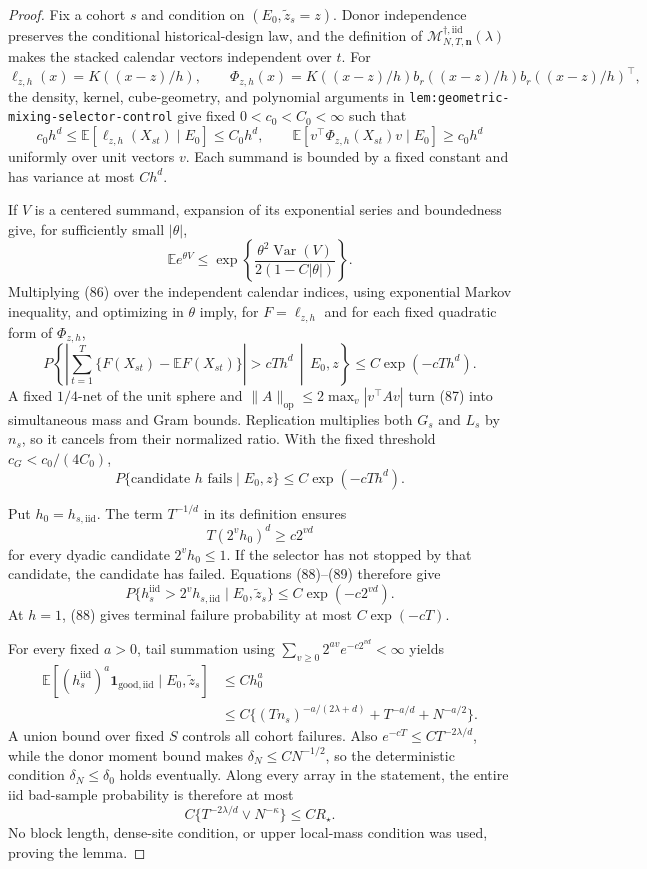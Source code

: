 \documentclass{article}
\begin{document}
\begin{proof}
Fix a cohort \(s\) and condition on \((E_0,\widetilde z_s=z)\).  Donor independence preserves the conditional historical-design law, and the definition of \(\mathcal M_{N,T,\mathbf n}^{\dagger,\mathrm{iid}}(\lambda)\) makes the stacked calendar vectors independent over \(t\).  For
\[
\ell_{z,h}(x)=K((x-z)/h),
\qquad
\Phi_{z,h}(x)=K((x-z)/h)b_r((x-z)/h)b_r((x-z)/h)^\top,
\]
the density, kernel, cube-geometry, and polynomial arguments in \texttt{lem:geometric-mixing-selector-control} give fixed \(0<c_0<C_0<\infty\) such that
\[
c_0h^d\leq\mathbb E[\ell_{z,h}(X_{st})\mid E_0]
\leq C_0h^d,
\qquad
\mathbb E[v^\top\Phi_{z,h}(X_{st})v\mid E_0]
\geq c_0h^d
\tag{85}
\]
uniformly over unit vectors \(v\).  Each summand is bounded by a fixed constant and has variance at most \(Ch^d\).

If \(V\) is a centered summand, expansion of its exponential series and boundedness give, for sufficiently small \(|\theta|\),
\[
\mathbb Ee^{\theta V}
\leq\exp\!\left\{
\frac{\theta^2\operatorname{Var}(V)}{2(1-C|\theta|)}
\right\}.
\tag{86}
\]
Multiplying (86) over the independent calendar indices, using exponential Markov inequality, and optimizing in \(\theta\) imply, for \(F=\ell_{z,h}\) and for each fixed quadratic form of \(\Phi_{z,h}\),
\[
P\!\left\{
\left|\sum_{t=1}^{T}\{F(X_{st})-\mathbb EF(X_{st})\}\right|>cTh^d
\,\middle|\,E_0,z\right\}
\leq C\exp(-cTh^d).
\tag{87}
\]
A fixed \(1/4\)-net of the unit sphere and
\(\|A\|_{\mathrm{op}}\leq2\max_v|v^\top Av|\) turn (87) into simultaneous mass and Gram bounds.  Replication multiplies both \(G_s\) and \(L_s\) by \(n_s\), so it cancels from their normalized ratio.  With the fixed threshold \(c_G<c_0/(4C_0)\),
\[
P\{\text{candidate }h\text{ fails}\mid E_0,z\}
\leq C\exp(-cTh^d).
\tag{88}
\]

Put \(h_0=h_{s,\mathrm{iid}}\).  The term \(T^{-1/d}\) in its definition ensures
\[
T(2^vh_0)^d\geq c2^{vd}
\tag{89}
\]
for every dyadic candidate \(2^vh_0\leq1\).  If the selector has not stopped by that candidate, the candidate has failed.  Equations (88)--(89) therefore give
\[
P\{h_s^{\mathrm{iid}}>2^vh_{s,\mathrm{iid}}\mid E_0,\widetilde z_s\}
\leq C\exp(-c2^{vd}).
\tag{90}
\]
At \(h=1\), (88) gives terminal failure probability at most \(C\exp(-cT)\).

For every fixed \(a>0\), tail summation using
\(\sum_{v\geq0}2^{av}e^{-c2^{vd}}<\infty\) yields
\[
\begin{aligned}
\mathbb E[(h_s^{\mathrm{iid}})^a\mathbf1_{\mathrm{good,iid}}
\mid E_0,\widetilde z_s]
&\leq Ch_0^a\\
&\leq C\{(Tn_s)^{-a/(2\lambda+d)}+T^{-a/d}+N^{-a/2}\}.
\end{aligned}
\tag{91}
\]
A union bound over fixed \(S\) controls all cohort failures.  Also
\(e^{-cT}\leq CT^{-2\lambda/d}\), while the donor moment bound makes \(\delta_N\leq CN^{-1/2}\), so the deterministic condition \(\delta_N\leq\delta_0\) holds eventually.  Along every array in the statement, the entire iid bad-sample probability is therefore at most
\[
C\{T^{-2\lambda/d}\vee N^{-\kappa}\}\leq CR_\star.
\tag{92}
\]
No block length, dense-site condition, or upper local-mass condition was used, proving the lemma.
\end{proof}
\end{document}
